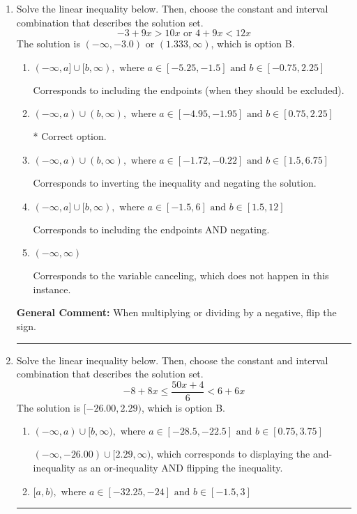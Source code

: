 \documentclass{extbook}[14pt]
\newcommand{\litem}[1]{\item #1

\rule{\textwidth}{0.4pt}}
\begin{document}
\begin{enumerate}
{\begin{enumerate}[label=\Alph*.]
You may have chosen this if you thought the inequality did not match the ends of the intervals.
\end{enumerate}

\textbf{General Comment:} Remember that less/greater than or equal to includes the endpoint, while less/greater do not. Also, remember that you need to flip the inequality when you multiply or divide by a negative.
}
\litem{
Solve the linear inequality below. Then, choose the constant and interval combination that describes the solution set.
\[ -3 + 9 x > 10 x \text{ or } 4 + 9 x < 12 x \]The solution is \( (-\infty, -3.0) \text{ or } (1.333, \infty) \), which is option B.\begin{enumerate}[label=\Alph*.]
\item \( (-\infty, a] \cup [b, \infty), \text{ where } a \in [-5.25, -1.5] \text{ and } b \in [-0.75, 2.25] \)

Corresponds to including the endpoints (when they should be excluded).
\item \( (-\infty, a) \cup (b, \infty), \text{ where } a \in [-4.95, -1.95] \text{ and } b \in [0.75, 2.25] \)

 * Correct option.
\item \( (-\infty, a) \cup (b, \infty), \text{ where } a \in [-1.72, -0.22] \text{ and } b \in [1.5, 6.75] \)

Corresponds to inverting the inequality and negating the solution.
\item \( (-\infty, a] \cup [b, \infty), \text{ where } a \in [-1.5, 6] \text{ and } b \in [1.5, 12] \)

Corresponds to including the endpoints AND negating.
\item \( (-\infty, \infty) \)

Corresponds to the variable canceling, which does not happen in this instance.
\end{enumerate}

\textbf{General Comment:} When multiplying or dividing by a negative, flip the sign.
}
\litem{
Solve the linear inequality below. Then, choose the constant and interval combination that describes the solution set.
\[ -8 + 8 x \leq \frac{50 x + 4}{6} < 6 + 6 x \]The solution is \( [-26.00, 2.29) \), which is option B.\begin{enumerate}[label=\Alph*.]
\item \( (-\infty, a) \cup [b, \infty), \text{ where } a \in [-28.5, -22.5] \text{ and } b \in [0.75, 3.75] \)

$(-\infty, -26.00) \cup [2.29, \infty)$, which corresponds to displaying the and-inequality as an or-inequality AND flipping the inequality.
\item \( [a, b), \text{ where } a \in [-32.25, -24] \text{ and } b \in [-1.5, 3] \)


\end{enumerate}}
\end{enumerate}
\end{document}
